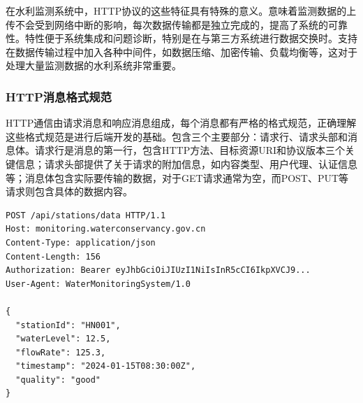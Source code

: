 在水利监测系统中，HTTP协议的这些特征具有特殊的意义。意味着监测数据的上传不会受到网络中断的影响，每次数据传输都是独立完成的，提高了系统的可靠性。特性便于系统集成和问题诊断，特别是在与第三方系统进行数据交换时。支持在数据传输过程中加入各种中间件，如数据压缩、加密传输、负载均衡等，这对于处理大量监测数据的水利系统非常重要。

\hypertarget{httpux6d88ux606fux683cux5f0fux89c4ux8303}{%
\subsubsection{HTTP消息格式规范}\label{httpux6d88ux606fux683cux5f0fux89c4ux8303}}

HTTP通信由请求消息和响应消息组成，每个消息都有严格的格式规范，正确理解这些格式规范是进行后端开发的基础。包含三个主要部分：请求行、请求头部和消息体。请求行是消息的第一行，包含HTTP方法、目标资源URI和协议版本三个关键信息；请求头部提供了关于请求的附加信息，如内容类型、用户代理、认证信息等；消息体包含实际要传输的数据，对于GET请求通常为空，而POST、PUT等请求则包含具体的数据内容。

\begin{lstlisting}
POST /api/stations/data HTTP/1.1
Host: monitoring.waterconservancy.gov.cn
Content-Type: application/json
Content-Length: 156
Authorization: Bearer eyJhbGciOiJIUzI1NiIsInR5cCI6IkpXVCJ9...
User-Agent: WaterMonitoringSystem/1.0

{
  "stationId": "HN001",
  "waterLevel": 12.5,
  "flowRate": 125.3,
  "timestamp": "2024-01-15T08:30:00Z",
  "quality": "good"
}
\end{lstlisting}


